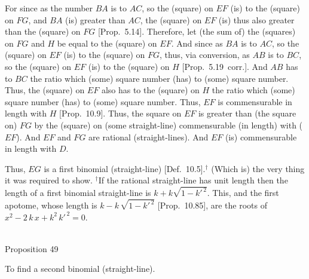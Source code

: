 \centerline{}

For since as the number $BA$ is to $AC$, so the (square) on $EF$ (is)
to the (square) on $FG$, and $BA$ (is) greater than $AC$, the
(square) on $EF$ (is) thus also greater than the (square) on $FG$ [Prop.~5.14]. Therefore, let (the sum of) the (squares)
on $FG$ and $H$ be equal to the (square) on $EF$. And since as $BA$
is to $AC$, so the (square) on $EF$ (is) to the (square) on $FG$, thus,
via conversion, as $AB$ is to $BC$, so the (square) on $EF$ (is) to
the (square) on $H$ [Prop.~5.19~corr.]. 
And $AB$ has to $BC$ the ratio which (some) square number (has) to
(some) square number. Thus, the (square) on $EF$ also has to
the (square) on $H$ the ratio which (some) square number (has) to
(some) square number. Thus,
$EF$ is commensurable in length with $H$  [Prop.~10.9]. Thus, the square on $EF$
is greater than (the square on) $FG$ by the (square) on (some straight-line)
commensurable (in length) with ($EF$). And $EF$ and $FG$ are rational (straight-lines). And $EF$ (is) commensurable in length with $D$.

Thus, $EG$ is a first binomial (straight-line) [Def.~10.5].$^\dag$
(Which is) the very thing it was required to show.
{\footnotesize\noindent $^\dag$If the rational straight-line has unit length then the length of a first binomial straight-line
is  $k+k\sqrt{1-k'^{\,2}}$. This, and the first apotome,
whose length is $k-k\,\sqrt{1-k'^{\,2}}$ [Prop.~10.85],
are the roots of $x^2- 2\,k\,x+k^2\,k'^{\,2}=0$.}  \\~\\


\begin{center}
{\large Proposition 49}
\end{center}

To find a second binomial (straight-line).

\centerline{}

